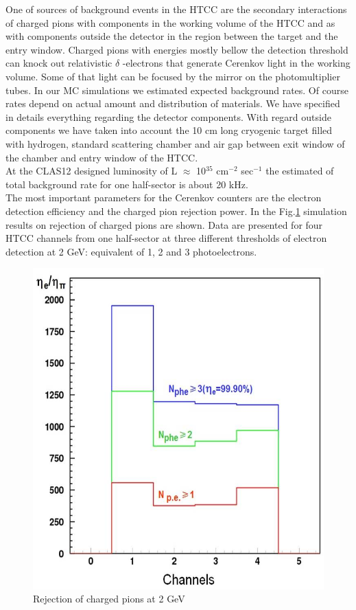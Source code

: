 \indent One of sources of background events in the HTCC are the secondary interactions of charged pions with components in the working volume of the HTCC and as with components outside the detector in the region between the target and the entry window. Charged pions with energies mostly bellow the detection threshold can knock out relativistic $\delta$ -electrons that generate Cerenkov light in the working volume. Some of that light can be focused by the mirror on the photomultiplier tubes. In our MC simulations we estimated expected background rates. Of course rates depend on actual amount and distribution of materials. We have specified in details  everything regarding the detector components. With regard outside components we have taken into account the 10 cm long cryogenic target filled with hydrogen, standard scattering chamber and air gap between exit window of the chamber and entry window of the HTCC. \\
\indent At the CLAS12 designed luminosity of L $\approx$ 10$^{35}$ cm$^{-2}$ sec$^{-1}$ the estimated of total background rate for one half-sector is about 20 kHz. \\  
\indent The most important parameters for the Cerenkov counters are the electron detection efficiency and the charged pion rejection power. In the Fig.\ref{fig:Pion_rejection_2GeV} simulation results on rejection of charged pions are shown. Data are presented for four HTCC channels from one half-sector at three different thresholds of electron detection at 2 GeV: equivalent of 1, 2 and 3 photoelectrons. 

\begin{figure}[!ht]
    \centering
    \includegraphics[width=1.0\linewidth,trim={0.0cm 0.0cm 0.0cm 0.0cm},clip]{images/Pion_rejection_2GeV.jpg}
    \caption{Rejection of charged pions at 2 GeV}
    \label{fig:Pion_rejection_2GeV}
\end{figure}

